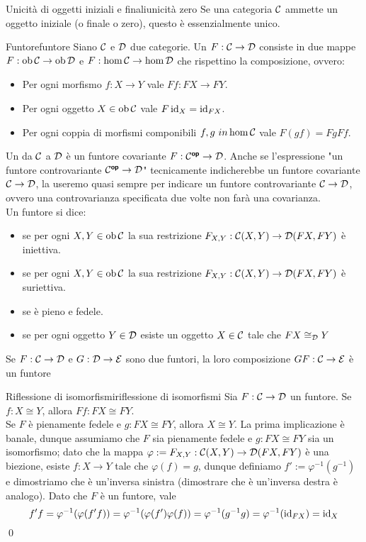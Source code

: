 \documentclass{article}
\renewcommand\C{\mc{C}}
\newcommand\D{\mc{D}}
\begin{document}
\begin{proposition}{Unicità di oggetti iniziali e finali}{unicità zero}
    Se una categoria $\C$ ammette un oggetto iniziale (o finale o zero), questo è essenzialmente unico.
\end{proposition}

\begin{definition}{Funtore}{funtore}
    Siano $\C$ e $\D$ due categorie. Un  $F: \C\to\D$ consiste in due mappe $F:\ob\C\to\ob\D$ e $F:\hom\C\to\hom\D$ che rispettino la composizione, ovvero:\begin{itemize}
        \item Per ogni morfismo $f :X\to Y$ vale $Ff: FX \to FY$.
        \item Per ogni oggetto $X \in \ob\C$ vale $F\operatorname{id}_X = \operatorname{id}_{FX}$.
        \item Per ogni coppia di morfismi componibili $f,g\ in \hom\C$ vale $F(gf) = FgFf$.
    \end{itemize}
    Un  da $\C$ a $\D$ è un funtore covariante $F: \C^\op\to\D$. Anche se l'espressione "un funtore controvariante $\C^\op\to\D$" tecnicamente indicherebbe un funtore covariante $\C\to\D$, la useremo quasi sempre per indicare un funtore controvariante $\C\to\D$, ovvero una controvarianza specificata due volte non farà una covarianza.\\
    Un funtore si dice:\begin{itemize}
        \item {} se per ogni $X,Y \in \ob\C$ la sua restrizione $F_{X,Y}:\C(X,Y)\to \D(FX,FY)$ è iniettiva.
        \item {} se per ogni $X,Y \in \ob\C$ la sua restrizione $F_{X,Y}:\C(X,Y)\to \D(FX,FY)$ è suriettiva.
        \item {} se è pieno e fedele.
        \item {} se per ogni oggetto $Y \in \D$ esiste un oggetto $X \in \C$ tale che $FX\cong_\D Y$
    \end{itemize}
    Se $F:\C\to\D$ e $G:\D\to\mc{E}$ sono due funtori, la loro composizione $GF : \C\to\mc{E}$ è un funtore
\end{definition}

\begin{proposition}{Riflessione di isomorfismi}{riflessione di isomorfismi}
    Sia $F:\C\to\D$ un funtore. Se $f:X\cong Y$, allora $Ff:FX\cong FY$.\\
    Se $F$ è pienamente fedele e $g:FX\cong FY$, allora $X\cong Y$.
    \proof 
    La prima implicazione è banale, dunque assumiamo che $F$ sia pienamente fedele e $g:FX\cong FY$ sia un isomorfismo; dato che la mappa $\varphi := F_{X,Y} : \C(X,Y) \to \D(FX,FY)$ è una biezione, esiste $f: X\to Y$ tale che $\varphi(f) = g$, dunque definiamo $f' := \varphi^{-1}(g^{-1})$ e dimostriamo che è un'inversa sinistra (dimostrare che è un'inversa destra è analogo). Dato che $F$ è un funtore, vale
    \[f'f = \varphi^{-1}(\varphi(f'f) )=\varphi^{-1}(\varphi(f')\varphi(f)) = \varphi^{-1}(g^{-1}g) = \varphi^{-1}(\operatorname{id}_{FX}) = \operatorname{id}_X\]
    \qed
\end{proposition}
\end{document}
